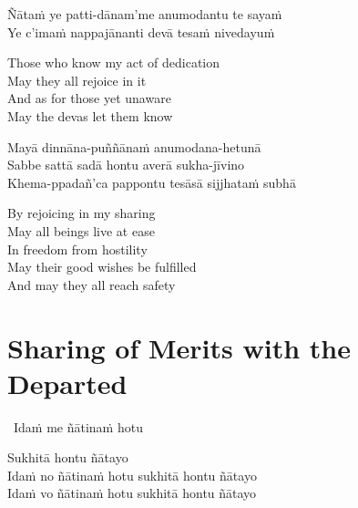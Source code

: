 \ifbfive\clearpage\fi

Ñātaṁ ye patti-dānam'me anumodantu te sayaṁ\\
Ye c'imaṁ nappajānanti devā tesaṁ nivedayuṁ

\ifafive\clearpage\fi

\begin{english-verses}
  Those who know my act of dedication\\
  May they all rejoice in it\\
  And as for those yet unaware\\
  May the devas let them know
\end{english-verses}

Mayā dinnāna-puññānaṁ anumodana-hetunā\\
Sabbe sattā sadā hontu averā sukha-jīvino\\
Khema-ppadañ'ca pappontu tesāsā sijjhataṁ subhā

\begin{english-verses}
  By rejoicing in my sharing\\
  May all beings live at ease\\
  In freedom from hostility\\
  May their good wishes be fulfilled\\
  And may they all reach safety
\end{english-verses}

\suttaRef{[Thai]}

\ifdigital{}\fi



\section{Sharing of Merits with the Departed}
\label{sharing-merits-departed}

\begin{leader-only}
  \anglebracketleft\ \hspace{-0.5mm}Idaṁ me ñātinaṁ hotu \hspace{-0.5mm}\anglebracketright\
\end{leader-only}

\vspace{-0.99em}

\begin{pali-hang}
  Sukhitā hontu ñātayo\\
  Idaṁ no ñātinaṁ hotu sukhitā hontu ñātayo\\
  Idaṁ vo ñātinaṁ hotu sukhitā hontu ñātayo
\end{pali-hang}

